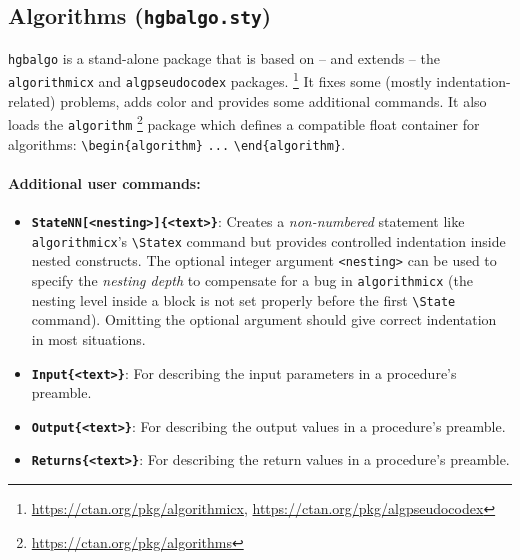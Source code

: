 \documentclass[english]{hgbarticle}
\begin{document}
\subsection{Algorithms (\texttt{hgbalgo.sty})}

\texttt{hgbalgo} is a stand-alone package that is based on -- and extends --
the \texttt{algorithmicx} and \texttt{algpseudocodex} packages.%
\footnote{\url{https://ctan.org/pkg/algorithmicx},
    \url{https://ctan.org/pkg/algpseudocodex}}
It fixes some (mostly indentation-related) problems, adds color and provides
some additional commands. It also loads the \texttt{algorithm}%
\footnote{\url{https://ctan.org/pkg/algorithms}}
package which defines a compatible float container for algorithms:
\verb!\begin{algorithm}! \verb!...! \verb!\end{algorithm}!.

\paragraph{Additional user commands:}
\begin{itemize}
    \item
    \textbf{\texttt{{\bs}StateNN[<nesting>]\{<text>\}}}:
    Creates a \emph{non-numbered} statement like \texttt{algo\-rith\-micx}'s
    \verb!\Statex! command but provides controlled indentation inside nested
    constructs. The optional integer argument \verb!<nesting>! can be used to
    specify the \emph{nesting depth} to compensate for a bug in
    \texttt{algorithmicx} (the nesting level inside a block is not set
    properly before the first \verb!\State! command). Omitting the optional
    argument should give correct indentation in most situations.
    \item
    \textbf{\texttt{{\bs}Input\{<text>\}}}:
    For describing the input parameters in a procedure's preamble.
    \item
    \textbf{\texttt{{\bs}Output\{<text>\}}}:
    For describing the output values in a procedure's preamble.
    \item
    \textbf{\texttt{{\bs}Returns\{<text>\}}}:
    For describing the return values in a procedure's preamble.
\end{itemize}
\end{document}
